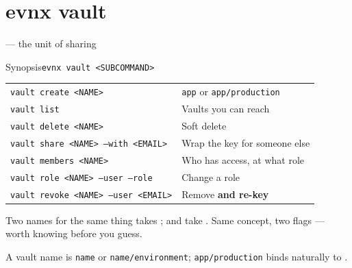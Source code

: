 \section{evnx vault}

\begin{frame}{ — the unit of sharing}
  \begin{block}{Synopsis}\texttt{evnx vault <SUBCOMMAND>}\end{block}

  \begin{tabular}{@{}ll@{}}
    \toprule
    \texttt{vault create <NAME>} & \texttt{app} or \texttt{app/production} \\
    \texttt{vault list}          & Vaults you can reach \\
    \texttt{vault delete <NAME>} & Soft delete \\
    \texttt{vault share <NAME> --with <EMAIL>} & Wrap the key for someone else \\
    \texttt{vault members <NAME>} & Who has access, at what role \\
    \texttt{vault role <NAME> --user --role} & Change a role \\
    \texttt{vault revoke <NAME> --user <EMAIL>} & Remove \textbf{and re-key} \\
    \bottomrule
  \end{tabular}

  \vspace{0.4em}
  \begin{alertblock}{Two names for the same thing}
     takes ;  and
     take . Same concept, two flags --- worth
    knowing before you guess.
  \end{alertblock}

  \vspace{0.3em}
  {\footnotesize A vault name is \texttt{name} or \texttt{name/environment};
  \texttt{app/production} binds naturally to .}
\end{frame}

